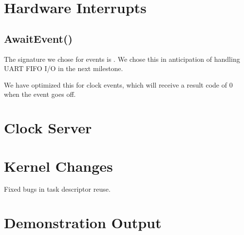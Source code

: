 \documentclass[pdftex,10pt,a4paper]{article}
\begin{document}
\newpage
\section*{Hardware Interrupts}

\subsection*{AwaitEvent()}

The signature we chose for events is
. We chose
this in anticipation of handling UART FIFO I/O in the next
milestone.

We have optimized this for clock events, which will receive a result
code of 0 when the event goes off.

\section*{Clock Server}

\section*{Kernel Changes}

Fixed bugs in task descriptor reuse.

\section*{Demonstration Output}
\end{document}
